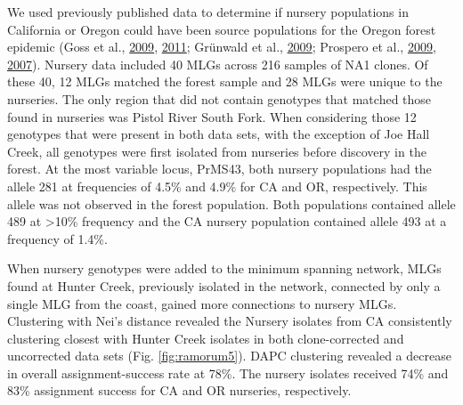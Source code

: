 \documentclass[double,12pt]{beavtex}
\begin{document}
  We used previously published data to determine if nursery populations in
  California or Oregon could have been source populations for the Oregon
  forest epidemic (Goss et al.,
  \protect\hyperlink{ref-goss2009population}{2009},
  \protect\hyperlink{ref-goss2011phytophthora}{2011}; Grünwald et al.,
  \protect\hyperlink{ref-grunwald2009standardizing}{2009}; Prospero et
  al., \protect\hyperlink{ref-prospero2009migration}{2009},
  \protect\hyperlink{ref-prospero2007population}{2007}). Nursery data
  included 40 MLGs across 216 samples of NA1 clones. Of these 40, 12 MLGs
  matched the forest sample and 28 MLGs were unique to the nurseries. The
  only region that did not contain genotypes that matched those found in
  nurseries was Pistol River South Fork. When considering those 12
  genotypes that were present in both data sets, with the exception of Joe
  Hall Creek, all genotypes were first isolated from nurseries before
  discovery in the forest. At the most variable locus, PrMS43, both
  nursery populations had the allele 281 at frequencies of 4.5\% and 4.9\%
  for CA and OR, respectively. This allele was not observed in the forest
  population. Both populations contained allele 489 at \textgreater{}10\%
  frequency and the CA nursery population contained allele 493 at a
  frequency of 1.4\%.
  
  When nursery genotypes were added to the minimum spanning network, MLGs
  found at Hunter Creek, previously isolated in the network, connected by
  only a single MLG from the coast, gained more connections to nursery
  MLGs. Clustering with Nei's distance revealed the Nursery isolates from
  CA consistently clustering closest with Hunter Creek isolates in both
  clone-corrected and uncorrected data sets (Fig. \ref{fig:ramorum5}).
  DAPC clustering revealed a decrease in overall assignment-success rate
  at 78\%. The nursery isolates received 74\% and 83\% assignment success
  for CA and OR nurseries, respectively.
  
\end{document}
